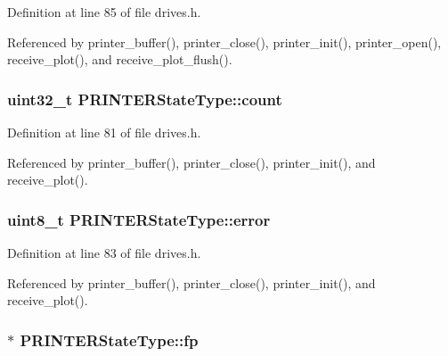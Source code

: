 Definition at line 85 of file drives.\+h.



Referenced by printer\+\_\+buffer(), printer\+\_\+close(), printer\+\_\+init(), printer\+\_\+open(), receive\+\_\+plot(), and receive\+\_\+plot\+\_\+flush().

\subsubsection[{\texorpdfstring{count}{count}}]{\setlength{\rightskip}{0pt plus 5cm}uint32\+\_\+t P\+R\+I\+N\+T\+E\+R\+State\+Type\+::count}\hypertarget{structPRINTERStateType_ae115fc351910f3801e37b31f254fb8f4}{}\label{structPRINTERStateType_ae115fc351910f3801e37b31f254fb8f4}


Definition at line 81 of file drives.\+h.



Referenced by printer\+\_\+buffer(), printer\+\_\+close(), printer\+\_\+init(), and receive\+\_\+plot().

\subsubsection[{\texorpdfstring{error}{error}}]{\setlength{\rightskip}{0pt plus 5cm}uint8\+\_\+t P\+R\+I\+N\+T\+E\+R\+State\+Type\+::error}\hypertarget{structPRINTERStateType_a6e5b550f5396901febd5475445132dd0}{}\label{structPRINTERStateType_a6e5b550f5396901febd5475445132dd0}


Definition at line 83 of file drives.\+h.



Referenced by printer\+\_\+buffer(), printer\+\_\+close(), printer\+\_\+init(), and receive\+\_\+plot().

\subsubsection[{\texorpdfstring{fp}{fp}}]{$\ast$ P\+R\+I\+N\+T\+E\+R\+State\+Type\+::fp}\hypertarget{structPRINTERStateType_a791c78d68d169f9d2e60d34b890e520a}{}\label{structPRINTERStateType_a791c78d68d169f9d2e60d34b890e520a}


